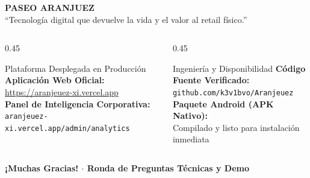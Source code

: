 \documentclass[aspectratio=169, 10pt]{beamer}
\begin{document}
\begin{frame}[plain]

  \begin{center}
    \vspace{0.4cm}
    {\Huge \textbf{\color{AranjuezGold}PASEO ARANJUEZ}} \\
    \vskip 0.15cm
    {\large \color{white}``Tecnología digital que devuelve la vida y el valor al retail físico.''}
    \vskip 0.5cm

    \begin{columns}[c]
      \begin{column}{0.45\textwidth}
        \begin{block}{Plataforma Desplegada en Producción}
          \centering \scriptsize
          \textbf{Aplicación Web Oficial:} \\
          \url{https://aranjeuez-xi.vercel.app} \\
          \vskip 0.15cm
          \textbf{Panel de Inteligencia Corporativa:} \\
          \texttt{aranjeuez-xi.vercel.app/admin/analytics}
        \end{block}
      \end{column}

      \begin{column}{0.45\textwidth}
        \begin{exampleblock}{Ingeniería y Disponibilidad}
          \centering \scriptsize
          \textbf{Código Fuente Verificado:} \\
          \texttt{github.com/k3v1bvo/Aranjeuez} \\
          \vskip 0.15cm
          \textbf{Paquete Android (APK Nativo):} \\
          Compilado y listo para instalación inmediata
        \end{exampleblock}
      \end{column}
    \end{columns}

    \vskip 0.5cm
    {\large \color{AranjuezOrange} \textbf{¡Muchas Gracias! $\cdot$ Ronda de Preguntas Técnicas y Demo}}
  \end{center}
\end{frame}
\end{document}
